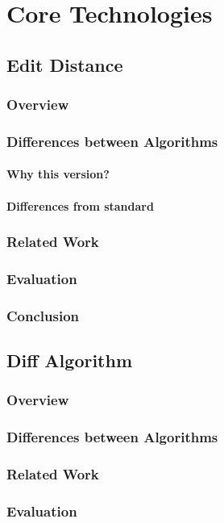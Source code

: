 
\part{Core Technologies}

\chapter{Edit Distance}
    \section{Overview}
    \section{Differences between Algorithms}
        \subsection{Why this version?}
        \subsection{Differences from standard}
    \section{Related Work}
    \section{Evaluation}
    \section{Conclusion}

\chapter{Diff Algorithm}
    \section{Overview}
    \section{Differences between Algorithms}
    \section{Related Work}
    \section{Evaluation}
